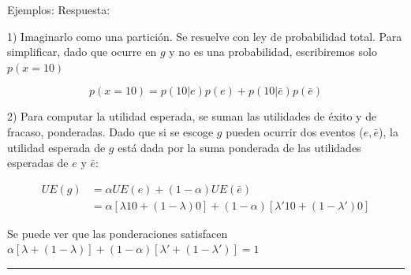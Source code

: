 \documentclass[12pt]{scrartcl}
\theoremstyle{definition}
\begin{document}
\begin{exbox}{Ejemplos:}
Respuesta:

1) Imaginarlo como una partición. Se resuelve con ley de probabilidad total. Para simplificar, dado que ocurre en $g$ y no es una probabilidad, escribiremos solo $p(x=10)$

\[p(x=10)=p(10 | e)p(e) + p(10 | \bar{e})p(\bar{e})\] 

2) Para computar la utilidad esperada, se suman las utilidades de éxito y de fracaso, ponderadas. Dado que si se escoge $g$ pueden ocurrir dos eventos ($e, \bar{e}$), la utilidad esperada de $g$ está dada por la suma ponderada de las utilidades esperadas de $e$ y $\bar{e}$:

\begin{align*}
    UE(g) &= \alpha UE(e) + (1-\alpha) UE(\bar{e})\\
          &= \alpha [\lambda 10 +(1-\lambda)0 ] + (1-\alpha)[\lambda'10 + (1-\lambda')0]
\end{align*}

Se puede ver que las ponderaciones satisfacen $\alpha[\lambda + (1-\lambda)] + (1-\alpha)[\lambda' + (1-\lambda')] = 1$

\rule[1pt]{1cm}{1pt}







\end{exbox}
\end{document}
